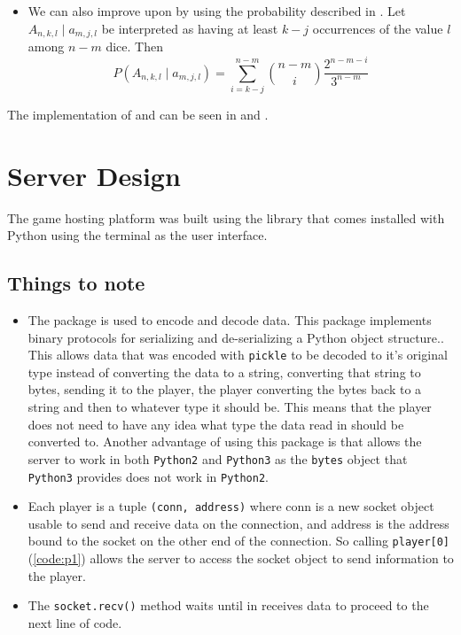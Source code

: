 \begin{itemize}
    \item We can also improve upon  by using the probability described in . Let $A_{n, k ,l} \mid a_{m, j, l}$ be interpreted as having at least $k - j$ occurrences of the value $l$ among $n - m$ dice. Then
    \begin{equation}
        \label{eq:prob_b1}
        P(A_{n, k ,l} \mid a_{m, j, l}) = \sum_{i = k - j}^{n - m}\binom{n-m}{i}\frac{2^{n-m-i}}{3^{n - m}}
    \end{equation}
\end{itemize}

The implementation of  and  can be seen in  and .
\section{Server Design}

The game hosting platform was built using the  library that comes installed with Python using the terminal as the user interface.

\subsection{Things to note}

\begin{itemize}
    \item The  package is used to encode and decode data. This package implements binary protocols for serializing and de-serializing a Python object structure.\autocite{pickle}. This allows data that was encoded with \texttt{pickle} to be decoded to it's original type instead of converting the data to a string, converting that string to bytes, sending it to the player, the player converting the bytes back to a string and then to whatever type it should be. This means that the player does not need to have any idea what type the data read in should be converted to. Another advantage of using this package is that allows the server to work in both \texttt{Python2} and \texttt{Python3} as the \texttt{bytes} object that \texttt{Python3} provides does not work in \texttt{Python2}.
    \item Each player is a tuple \texttt{(conn, address)} where conn is a new socket object usable to send and receive data on the connection, and address is the address bound to the socket on the other end of the connection. So calling \texttt{player[0]}(\ref{code:p1}) allows the server to access the socket object to send information to the player.
    \item The \texttt{socket.recv()} method waits until in receives data to proceed to the next line of code.
\end{itemize}

